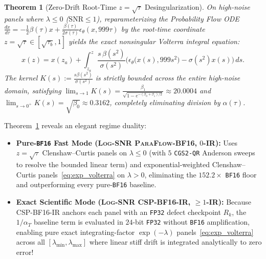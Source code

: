 \documentclass[11pt,a4paper]{article}
\newtheorem{theorem}{Theorem}
\theoremstyle{definition}
\theoremstyle{remark}
\newcommand{\bfsixteen}{\texttt{BF16}}
\newcommand{\fpthirtytwo}{\texttt{FP32}}
\begin{document}
\begin{theorem}[Zero-Drift Root-Time $z = \sqrt{\tau}$ Desingularization]
\label{thm:desing}
On high-noise panels where $\lambda \le 0$ ($\mathrm{SNR} \le 1$), reparameterizing the Probability Flow ODE $\frac{dx}{d\tau} = -\frac{1}{2}\beta(\tau)x + \frac{\beta(\tau)}{2\sigma(\tau)}\epsilon_\theta(x, 999\tau)$ by the root-time coordinate $z = \sqrt{\tau} \in [\sqrt{\tau_b}, 1]$ yields the exact nonsingular Volterra integral equation:
\begin{equation}
\label{eq:z_volterra}
    x(z) = x(z_a) + \int_{z_a}^z \frac{s\,\beta(s^2)}{\sigma(s^2)}\Big(\epsilon_\theta\big(x(s), 999 s^2\big) - \sigma(s^2) x(s)\Big)\,ds.
\end{equation}
The kernel $K(s) := \frac{s\beta(s^2)}{\sigma(s^2)}$ is strictly bounded across the entire high-noise domain, satisfying $\lim_{s\to 1} K(s) = \frac{\beta_1}{\sqrt{1 - e^{-(\beta_0+\beta_1)/2}}} \approx 20.0004$ and $\lim_{s\to 0^+} K(s) = \sqrt{\beta_0} \approx 0.3162$, completely eliminating division by $\alpha(\tau)$.
\end{theorem}
Theorem~\ref{thm:desing} reveals an elegant regime duality:
\begin{itemize}[leftmargin=1.8em,itemsep=2pt]
    \item \textbf{Pure-\bfsixteen{} Fast Mode (\textsc{Log-SNR ParaFlow-BF16}, $0$-IR):} Uses $z=\sqrt{\tau}$ Clenshaw--Curtis panels on $\lambda \le 0$ (with $5$ \texttt{CGS2-QR} Anderson sweeps to resolve the bounded linear term) and exponential-weighted Clenshaw--Curtis panels~\eqref{eq:exp_volterra} on $\lambda > 0$, eliminating the $152.2\times$ \bfsixteen{} floor and outperforming every pure-\bfsixteen{} baseline.
    \item \textbf{Exact Scientific Mode (\textsc{Log-SNR CSP-BF16-IR}, $\ge 1$-IR):} Because \textsc{CSP-BF16-IR} anchors each panel with an \fpthirtytwo{} defect checkpoint $R_k$, the $1/\alpha_T$ baseline term is evaluated in $24$-bit \fpthirtytwo{} without \bfsixteen{} amplification, enabling pure exact integrating-factor $\exp(-\lambda)$ panels~\eqref{eq:exp_volterra} across all $[\lambda_{\min}, \lambda_{\max}]$ where linear stiff drift is integrated analytically to zero error!
\end{itemize}
\end{document}
